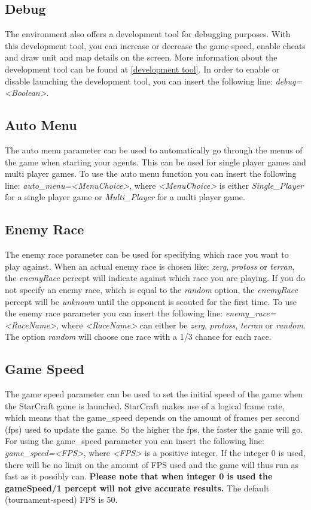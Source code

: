 \subsection{Debug}
\label{debug}
The environment also offers a development tool for debugging purposes. With this development tool, you can increase or decrease the game speed, enable cheats and draw unit and map details on the screen. More information about the development tool can be found at \ref{development tool}. In order to enable or disable launching the development tool, you can insert the following line: \textit{debug=<Boolean>}.

\subsection{Auto Menu}
\label{auto menu}
The auto menu parameter can be used to automatically go through the menus of the game when starting your agents. This can be used for single player games and multi player games. To use the auto menu function you can insert the following line: \textit{auto\_menu=<MenuChoice>}, where \textit{<MenuChoice>} is either \textit{Single\_Player} for a single player game or \textit{Multi\_Player} for a multi player game.

\subsection{Enemy Race}
\label{enemy race}
The enemy race parameter can be used for specifying which race you want to play against. When an actual enemy race is chosen like: \textit{zerg}, \textit{protoss} or \textit{terran}, the \textit{enemyRace} percept will indicate against which race you are playing. If you do not specify an enemy race, which is equal to the \textit{random} option, the \textit{enemyRace} percept will be \textit{unknown} until the opponent is scouted for the first time. To use the enemy race parameter you can insert the following line: \textit{enemy\_race=<RaceName>}, where \textit{<RaceName>} can either be \textit{zerg}, \textit{protoss}, \textit{terran} or \textit{random}. The option \textit{random} will choose one race with a 1/3 chance for each race.

\subsection{Game Speed}
\label{game speed}
The game speed parameter can be used to set the initial speed of the game when the StarCraft game is launched. StarCraft makes use of a logical frame rate, which means that the game\_speed depends on the amount of frames per second (fps) used to update the game. So the higher the fps, the faster the game will go. For using the game\_speed parameter you can insert the following line: \textit{game\_speed=<FPS>}, where \textit{<FPS>} is a positive integer. If the integer 0 is used, there will be no limit on the amount of FPS used and the game will thus run as fast as it possibly can. \textbf{Please note that when integer 0 is used the gameSpeed/1 percept will not give accurate results.} The default (tournament-speed) FPS is 50.

